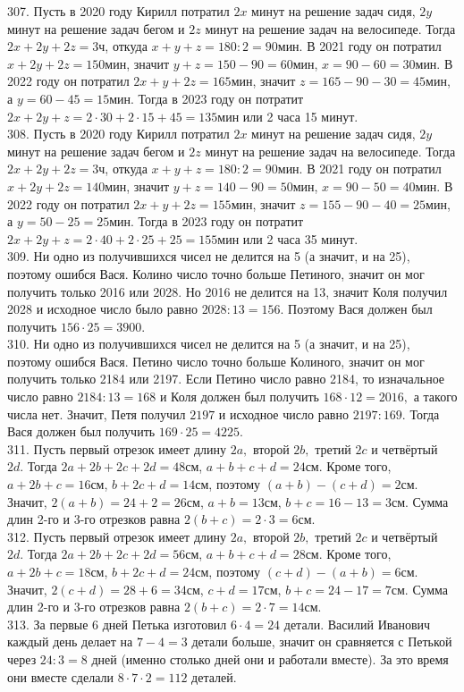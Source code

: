 \documentclass[12pt]{article}
\begin{document}
307. Пусть в 2020 году Кирилл потратил $2x$ минут на решение задач сидя, $2y$ минут на решение задач бегом и $2z$ минут на решение задач на велосипеде. Тогда
$2x+2y+2z=3$ч, откуда $x+y+z=180:2=90$мин. В 2021 году он потратил $x+2y+2z=150$мин, значит $y+z=150-90=60$мин, $x=90-60=30$мин. В 2022 году он потратил $2x+y+2z=165$мин, значит $z=165-90-30=45$мин, а $y=60-45=15$мин. Тогда в 2023 году он потратит $2x+2y+z=2\cdot30+2\cdot15+45=135$мин или 2 часа 15 минут.\\
308. Пусть в 2020 году Кирилл потратил $2x$ минут на решение задач сидя, $2y$ минут на решение задач бегом и $2z$ минут на решение задач на велосипеде. Тогда
$2x+2y+2z=3$ч, откуда $x+y+z=180:2=90$мин. В 2021 году он потратил $x+2y+2z=140$мин, значит $y+z=140-90=50$мин, $x=90-50=40$мин. В 2022 году он потратил $2x+y+2z=155$мин, значит $z=155-90-40=25$мин, а $y=50-25=25$мин. Тогда в 2023 году он потратит $2x+2y+z=2\cdot40+2\cdot25+25=155$мин или 2 часа 35 минут.\\
309. Ни одно из получившихся чисел не делится на 5 (а значит, и на 25), поэтому ошибся Вася. Колино число точно больше Петиного, значит он мог получить только 2016 или 2028. Но 2016 не делится на 13, значит Коля получил 2028 и исходное число было равно $2028:13=156.$ Поэтому Вася должен был получить $156\cdot25=3900.$\\
310. Ни одно из получившихся чисел не делится на 5 (а значит, и на 25), поэтому ошибся Вася. Петино число точно больше Колиного, значит он мог получить только 2184 или 2197. Если Петино число равно 2184, то изначальное число равно $2184:13=168$ и Коля должен был получить $168\cdot12=2016,$ а такого числа нет. Значит, Петя получил $2197$ и исходное число равно $2197:169.$ Тогда Вася должен был получить $169\cdot25=4225.$\\
311. Пусть первый отрезок имеет длину $2a,$ второй $2b,$ третий $2c$ и четвёртый $2d.$ Тогда $2a+2b+2c+2d=48$см, $a+b+c+d=24$см. Кроме того, $a+2b+c=16$см, $b+2c+d=14$см, поэтому $(a+b)-(c+d)=2$см. Значит, $2(a+b)=24+2=26$см, $a+b=13$см, $b+c=16-13=3$см. Сумма длин 2-го и 3-го отрезков равна $2(b+c)=2\cdot3=6$см.\\
312. Пусть первый отрезок имеет длину $2a,$ второй $2b,$ третий $2c$ и четвёртый $2d.$ Тогда $2a+2b+2c+2d=56$см, $a+b+c+d=28$см. Кроме того, $a+2b+c=18$см, $b+2c+d=24$см, поэтому $(c+d)-(a+b)=6$см. Значит, $2(c+d)=28+6=34$см, $c+d=17$см, $b+c=24-17=7$см. Сумма длин 2-го и 3-го отрезков равна $2(b+c)=2\cdot7=14$см.\\
313. За первые 6 дней Петька изготовил $6\cdot4=24$ детали. Василий Иванович каждый день делает на $7-4=3$ детали больше, значит он сравняется с Петькой через $24:3=8$ дней (именно столько дней они и работали вместе). За это время они вместе сделали $8\cdot7\cdot2=112$ деталей.\\
\end{document}
